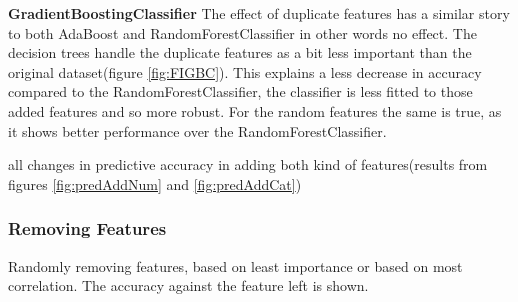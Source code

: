 \documentclass[a4paper,10pt]{article}
\begin{document}
\textbf{GradientBoostingClassifier} The effect of duplicate features has a similar story to both AdaBoost and RandomForestClassifier in other words no effect. The decision trees handle the duplicate features as a bit less important than the original dataset(figure \ref{fig:FIGBC}). This explains a less decrease in accuracy compared to the RandomForestClassifier, the classifier is less fitted to those added features and so more robust. For the random features the same is true, as it shows better performance over the RandomForestClassifier. \\

\begin{table}[h]
	\centering
	\caption{all changes in predictive accuracy in adding both kind of features(results from figures \ref{fig:predAddNum} and \ref{fig:predAddCat})}\label{table:fluc}
\end{table}
\newpage

\subsubsection{Removing Features}
Randomly removing features, based on least importance or based on most correlation. The accuracy against the feature left is shown. 
\end{document}
